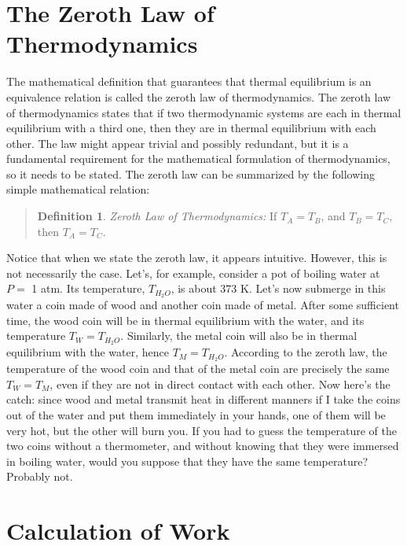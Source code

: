 \documentclass[
  9pt,
]{extbook}
\theoremstyle{definition}
\newtheorem{definition}{Definition}[chapter]
\theoremstyle{definition}
\theoremstyle{definition}
\theoremstyle{remark}
\begin{document}
\hypertarget{the-zeroth-law-of-thermodynamics}{%
\section{The Zeroth Law of Thermodynamics}\label{the-zeroth-law-of-thermodynamics}}

The mathematical definition that guarantees that thermal equilibrium is an equivalence relation is called the zeroth law of thermodynamics. The zeroth law of thermodynamics states that if two thermodynamic systems are each in thermal equilibrium with a third one, then they are in thermal equilibrium with each other. The law might appear trivial and possibly redundant, but it is a fundamental requirement for the mathematical formulation of thermodynamics, so it needs to be stated. The zeroth law can be summarized by the following simple mathematical relation:

\begin{quote}
\begin{definition}
\protect\hypertarget{def:zerothlaw}{}{\label{def:zerothlaw} }\emph{Zeroth Law of Thermodynamics:} If \(T_A = T_B\), and \(T_B = T_C\), then \(T_A = T_C\).
\end{definition}
\end{quote}

Notice that when we state the zeroth law, it appears intuitive. However, this is not necessarily the case. Let's, for example, consider a pot of boiling water at \(P=\) 1 atm. Its temperature, \(T_{H_2O}\), is about 373 K. Let's now submerge in this water a coin made of wood and another coin made of metal. After some sufficient time, the wood coin will be in thermal equilibrium with the water, and its temperature \(T_W = T_{H_2O}\). Similarly, the metal coin will also be in thermal equilibrium with the water, hence \(T_M = T_{H_2O}\). According to the zeroth law, the temperature of the wood coin and that of the metal coin are precisely the same \(T_W = T_M\), even if they are not in direct contact with each other. Now here's the catch: since wood and metal transmit heat in different manners if I take the coins out of the water and put them immediately in your hands, one of them will be very hot, but the other will burn you. If you had to guess the temperature of the two coins without a thermometer, and without knowing that they were immersed in boiling water, would you suppose that they have the same temperature? Probably not.

\hypertarget{workint}{%
\section{Calculation of Work}\label{workint}}
\end{document}
